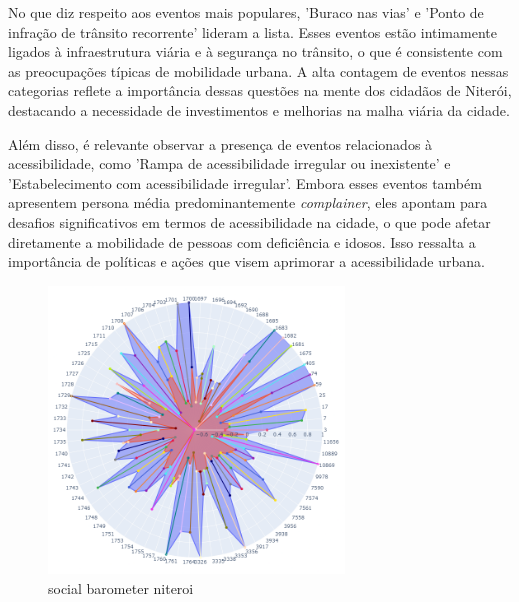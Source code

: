 No que diz respeito aos eventos mais populares, 'Buraco nas vias' e 'Ponto de infração de trânsito recorrente' lideram a lista. Esses eventos estão intimamente ligados à infraestrutura viária e à segurança no trânsito, o que é consistente com as preocupações típicas de mobilidade urbana. A alta contagem de eventos nessas categorias reflete a importância dessas questões na mente dos cidadãos de Niterói, destacando a necessidade de investimentos e melhorias na malha viária da cidade.

Além disso, é relevante observar a presença de eventos relacionados à acessibilidade, como 'Rampa de acessibilidade irregular ou inexistente' e 'Estabelecimento com acessibilidade irregular'. Embora esses eventos também apresentem persona média predominantemente \textit{complainer}, eles apontam para desafios significativos em termos de acessibilidade na cidade, o que pode afetar diretamente a mobilidade de pessoas com deficiência e idosos. Isso ressalta a importância de políticas e ações que visem aprimorar a acessibilidade urbana.

\begin{figure}[htb]
	\centering
	\includegraphics[width=0.7\textwidth]{images/social_barometer_niteroi.png}
	\caption{social barometer niteroi}
	\label{fig:social_barometer_niteroi}
\end{figure}


